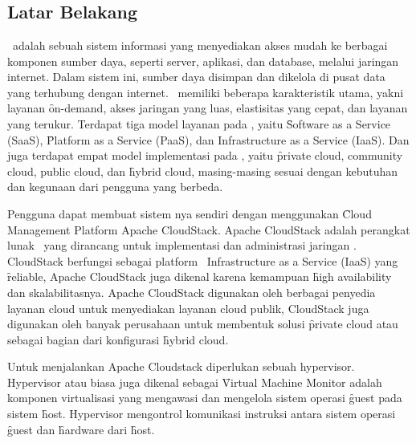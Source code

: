 \chapter{\babSatu}


\section{Latar Belakang}
\cc\ adalah sebuah sistem informasi yang menyediakan akses mudah ke berbagai komponen sumber daya, seperti server, aplikasi, dan database, melalui jaringan internet. Dalam sistem ini, sumber daya disimpan dan dikelola di pusat data yang terhubung dengan internet. \cc\ memiliki beberapa karakteristik utama, yakni layanan \f{on-demand}, akses jaringan yang luas, elastisitas yang cepat, dan layanan yang terukur. Terdapat tiga model layanan pada \cc, yaitu \f{Software as a Service} (SaaS), \f{Platform as a Service} (PaaS), dan Infrastructure as a Service (IaaS). Dan juga terdapat empat model implementasi pada \cc, yaitu \f{private cloud, community cloud, public cloud,} dan \f{hybrid cloud,} masing-masing sesuai dengan kebutuhan dan kegunaan dari pengguna yang berbeda\cite{mell2009nist}.

Pengguna dapat membuat sistem \cc nya sendiri dengan menggunakan \f{Cloud Management Platform} Apache CloudStack. Apache CloudStack adalah perangkat lunak \oss\ yang dirancang untuk implementasi dan administrasi jaringan \vm. CloudStack berfungsi sebagai platform \cc\ Infrastructure as a Service (IaaS) yang \f{reliable}, Apache CloudStack juga dikenal karena kemampuan \f{high availability} dan skalabilitasnya. Apache CloudStack digunakan oleh berbagai penyedia layanan cloud untuk menyediakan layanan cloud publik, CloudStack juga digunakan oleh banyak perusahaan untuk membentuk solusi \f{private cloud} atau sebagai bagian dari konfigurasi \f{hybrid cloud}\cite{cloudstackabout}.

Untuk menjalankan Apache Cloudstack diperlukan sebuah hypervisor. Hypervisor atau biasa juga dikenal sebagai \f{Virtual Machine Monitor} adalah komponen virtualisasi yang mengawasi dan mengelola sistem operasi \f{guest} pada sistem \f{host}\cite{scarfone2009nist}. Hypervisor mengontrol komunikasi instruksi antara sistem operasi \f{guest} dan \f{hardware} dari \f{host}\cite{scarfone2009nist}. 

